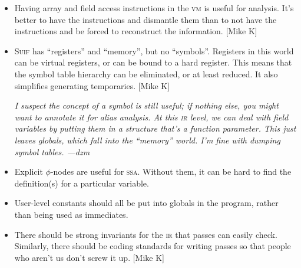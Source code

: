 \documentclass[11pt]{article}
\def\ir{\textsc{ir}}
\def\ssa{\textsc{ssa}}
\def\Suif{\textsc{Suif}}
\def\vm{\textsc{vm}}
\begin{document}
\begin{itemize}
\item Having array and field access instructions in the \vm{} is
  useful for analysis.  It's better to have the instructions and
  dismantle them than to not have the instructions and be forced to
  reconstruct the information.  [Mike K]

\item \Suif{} has ``registers'' and ``memory'', but no ``symbols''.
  Registers in this world can be virtual registers, or can be bound to
  a hard register.  This means that the symbol table hierarchy can be
  eliminated, or at least reduced.  It also simplifies generating
  temporaries.  [Mike K]

  \emph{I suspect the concept of a symbol is still useful; if nothing
    else, you might want to annotate it for alias analysis.  At this
    \ir{} level, we can deal with field variables by putting them in a
    structure that's a function parameter.  This just leaves globals,
    which fall into the ``memory'' world.  I'm fine with dumping
    symbol tables.  ---dzm}

\item Explicit $\phi$-nodes are useful for \ssa.  Without them, it can
  be hard to find the definition(s) for a particular variable.

\item User-level constants should all be put into globals in the
  program, rather than being used as immediates.

\item There should be strong invariants for the \ir{} that passes can
  easily check.  Similarly, there should be coding standards for
  writing passes so that people who aren't us don't screw it up.
  [Mike K]

\end{itemize}
\end{document}

